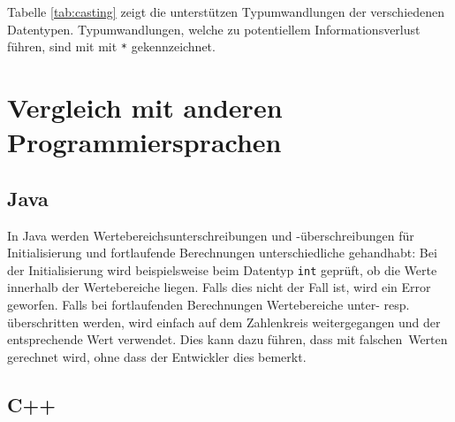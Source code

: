 \documentclass[10pt, a4paper, twocolumn]{article} %
\begin{document}
Tabelle \ref{tab:casting} zeigt die unterstützen Typumwandlungen der verschiedenen Datentypen.
Typumwandlungen, welche zu potentiellem Informationsverlust führen, sind mit mit \texttt{*} gekennzeichnet.
\begin{table}[h]
    \tiny
    \centering
    \caption{Casting zwischen Datentypen}
    \label{tab:casting}
\end{table}


\section{Vergleich mit anderen Programmiersprachen}
\subsection{Java}
In Java werden Wertebereichsunterschreibungen und -überschreibungen für Initialisierung und fortlaufende Berechnungen unterschiedliche gehandhabt:
Bei der Initialisierung wird beispielsweise beim Datentyp \texttt{int} geprüft, ob die Werte innerhalb der Wertebereiche liegen. Falls dies nicht der Fall ist, wird ein Error geworfen.
Falls bei fortlaufenden Berechnungen Wertebereiche unter- resp. überschritten werden, wird einfach auf dem Zahlenkreis weitergegangen und der entsprechende Wert verwendet.
Dies kann dazu führen, dass mit \glqq falschen\grqq \ Werten gerechnet wird, ohne dass der Entwickler dies bemerkt.

\subsection{C++}
\end{document}

